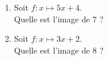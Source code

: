 \begin{multicols}{2}
\begin{enumerate}[itemsep=1.5em]
	\item \begin{minipage}[t]{\linewidth} Soit $f: x \longmapsto 5x+4$. \\ Quelle est l'image de $7$ ?\\ \dtf \end{minipage}
	\item \begin{minipage}[t]{\linewidth} Soit $f: x \longmapsto 3x+2$. \\ Quelle est l'image de $8$ ?\\ \dtf \end{minipage}
\end{enumerate}
\end{multicols}

